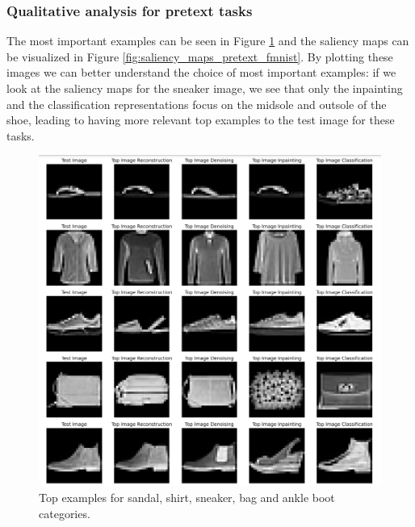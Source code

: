 \subsubsection{Qualitative analysis for pretext tasks}
The most important examples can be seen in Figure \ref{fig:topex_pretext_fmnist} and the saliency maps can be visualized in Figure \ref{fig:saliency_maps_pretext_fmnist}. By plotting these images we can better understand the choice of most important examples: if we look at the saliency maps for the sneaker image, we see that only the inpainting and the classification representations focus on the midsole and outsole of the shoe, leading to having more relevant top examples to the test image for these tasks.

\begin{figure}[H]
    \centering
    \includegraphics[width=14cm]{images/top_examples_fmnist.png}
    \caption{Top examples for sandal, shirt, sneaker, bag and ankle boot categories.}
    \label{fig:topex_pretext_fmnist}
\end{figure}

